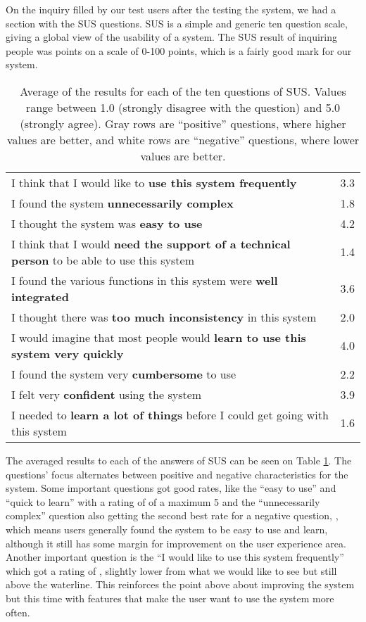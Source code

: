 On the inquiry filled by our test users after the testing the system, we had a section with the \acf{SUS} questions. \ac{SUS}\cite{Brooke:1996ua} is a simple and generic ten question scale, giving a global view of the usability of a system. The \ac{SUS} result of inquiring  people was  points on a scale of 0-100 points, which is a fairly good mark for our system.

\begin{table}[h]
	\renewcommand{\arraystretch}{1.5}
	\centering
\begin{tabular}{l|c}
I think that I would like to \textbf{use this system frequently} & 3.3\\
I found the system \textbf{unnecessarily complex} & 1.8\\
I thought the system was \textbf{easy to use} & 4.2\\
I think that I would \textbf{need the support of a technical person} to be able to use this system & 1.4\\
I found the various functions in this system were \textbf{well integrated} & 3.6\\
I thought there was \textbf{too much inconsistency} in this system & 2.0\\
I would imagine that most people would \textbf{learn to use this system very quickly} & 4.0\\
I found the system very \textbf{cumbersome} to use & 2.2\\
I felt very \textbf{confident} using the system & 3.9\\
I needed to \textbf{learn a lot of things} before I could get going with this system & 1.6\\
\end{tabular}
\caption[Average of the results for each of the ten questions of \ac{SUS}.]{Average of the results for each of the ten questions of \ac{SUS}. Values range between 1.0 (strongly disagree with the question) and 5.0 (strongly agree). Gray rows are ``positive'' questions, where higher values are better, and white rows are ``negative'' questions, where lower values are better.}
\label{tab:sus}
\vspace{\baselineskip}
\end{table}

The averaged results to each of the answers of \ac{SUS} can be seen on Table \ref{tab:sus}. The questions' focus alternates between positive and negative characteristics for the system. Some important questions got good rates, like the ``easy to use'' and ``quick to learn'' with a rating of  of a maximum 5 and the ``unnecessarily complex'' question also getting the second best rate for a negative question, , which means users generally found the system to be easy to use and learn, although it still has some margin for improvement on the user experience area. Another important question is the ``I would like to use this system frequently'' which got a rating of , slightly lower from what we would like to see but still above the waterline. This reinforces the point above about improving the system but this time with features that make the user want to use the system more often.

